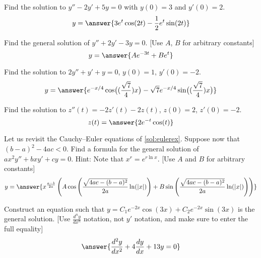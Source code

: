 \documentclass{ximera}
\begin{document}
\begin{exercise}
    Find the solution to $y'' - 2y' + 5y = 0$ with $y(0) = 3$ and $y'(0) = 2$. 
    \[
        y = \answer{3e^t\cos(2t) - \frac{1}{2}e^t\sin(2t)}
    \]
\end{exercise} 

\begin{exercise}
    Find the general solution of $y'' + 2y' - 3y = 0$. [Use $A$, $B$ for arbitrary constants]
    \[
        y = \answer{Ae^{-3t} + Be^t}
    \]
\end{exercise}

\begin{exercise}%
    Find the solution to $2y''+y'+y=0$, $y(0) = 1$, $y'(0)=-2$.
    \[
        y = \answer{e^{-x/4} \cos\bigl((\frac{\sqrt{7}}{4})x\bigr) - \sqrt{7}e^{-x/4} \sin\bigl((\frac{\sqrt{7}}{4})x\bigr)}
    \]
\end{exercise}

\begin{exercise}%
    Find the solution to $z''(t) = -2z'(t)-2z(t)$, $z(0) = 2$, $z'(0)= -2$.
    \[
        z(t) = \answer{2e^{-t} \cos(t)}
    \]
\end{exercise}


\begin{exercise}
    Let us revisit the Cauchy--Euler equations of \ref{sol:eulerex}.  Suppose now that ${(b-a)}^2-4ac < 0$.  Find a formula for the general solution of $a x^2 y'' + b x y' + c y = 0$.  Hint: Note that $x^r = e^{r \ln x}$. [Use $A$ and $B$ for arbitrary constants]
    \[
        y = \answer{x^{\frac{a-b}{2a}}\left( A\cos\left( \frac{\sqrt{4ac-(b-a)^2}}{2a} \ln(|x|) \right) + B\sin\left( \frac{\sqrt{4ac-(b-a)^2}}{2a} \ln(|x|) \right) \right)}
    \]
\end{exercise}

\begin{exercise}
    Construct an equation such that $y = C_1 e^{-2x} \cos(3x) + C_2 e^{-2x} \sin(3x)$ is the general solution. [Use $\frac{d^ny}{dx^n}$ notation, not $y'$ notation, and make sure to enter the full equality]
    \[
        \answer{\frac{d^2y}{dx^2} + 4\frac{dy}{dx} + 13y = 0}
    \]
\end{exercise}
\end{document}
